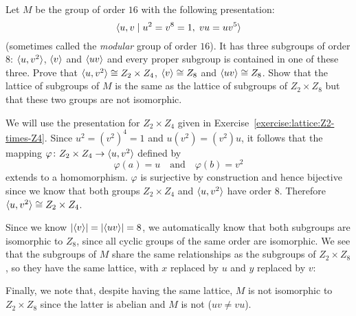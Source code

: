  Let $M$ be the group of order $16$ with the following
presentation:
\begin{equation*}
  \langle{u,v \mid u^2 = v^8 = 1, \; vu = uv^5}\rangle
\end{equation*}
(sometimes called the {\em modular} group of order $16$). It has three
subgroups of order $8$: $\langle{u,v^2}\rangle$, $\langle{v}\rangle$ and $\langle{uv}\rangle$ and
every proper subgroup is contained in one of these three. Prove that
$\langle{u,v^2}\rangle\cong Z_2\times Z_4$, $\langle{v}\rangle\cong Z_8$ and
$\langle{uv}\rangle\cong Z_8$. Show that the lattice of subgroups of $M$ is the
same as the lattice of subgroups of $Z_2\times Z_8$ but that these two
groups are not isomorphic.
\begin{solution}
  We will use the presentation for $Z_2\times Z_4$ given in
  Exercise~\ref{exercise:lattice:Z2-times-Z4}. Since
  $u^2 = (v^2)^4 = 1$ and $u(v^2) = (v^2)u$, it follows that the
  mapping $\varphi\colon Z_2\times Z_4\to\langle{u,v^2}\rangle$ defined by
  \begin{equation*}
    \varphi(a) = u
    \quad\text{and}\quad
    \varphi(b) = v^2
  \end{equation*}
  extends to a homomorphism. $\varphi$ is surjective by construction
  and hence bijective since we know that both groups $Z_2\times Z_4$
  and $\langle{u,v^2}\rangle$ have order $8$. Therefore
  $\langle{u,v^2}\rangle\cong Z_2\times Z_4$.

  Since we know $\lvert{\langle{v}\rangle}\rvert = \lvert{\langle{uv}\rangle}\rvert = 8$, we automatically
  know that both subgroups are isomorphic to $Z_8$, since all cyclic
  groups of the same order are isomorphic. We see that the subgroups
  of $M$ share the same relationships as the subgroups of
  $Z_2\times Z_8$, so they have the same lattice, with $x$ replaced by
  $u$ and $y$ replaced by $v$:
  \begin{center}
  \end{center}

  Finally, we note that, despite having the same lattice, $M$ is not
  isomorphic to $Z_2\times Z_8$ since the latter is abelian and $M$ is
  not ($uv \neq vu$).
\end{solution}
